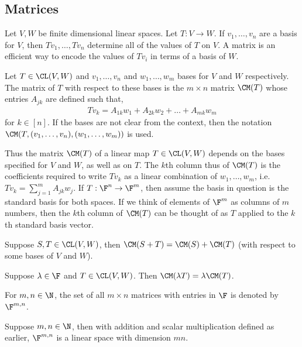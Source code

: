\documentclass{article}
\begin{document}
\subsection{Matrices}
  Let $V, W$ be finite dimensional linear spaces. Let $T: V \to W$. If $v_1, \dots, v_n$ are a basis for $V$, then $Tv_1, \dots, Tv_n$ determine all of the values of $T$ on $V$. A matrix is
  an efficient way to encode the values of $Tv_i$ in terms of a basis of $W$.
  \begin{defn}
    Let $T \in \CL(V, W)$ and $v_1, \dots, v_n$ and $w_1, \dots, w_m$ bases for $V$ and $W$ respectively. The matrix of $T$ with respect to these bases is the $m\times n$ matrix $\CM(T)$
    whose entries $A_{jk}$ are defined such that,
    \begin{align*}
      Tv_k = A_{1k}w_1 + A_{2k}w_2 + \dots + A_{mk}w_m
    \end{align*}
    for $k \in [n]$. If the bases are not clear from the context, then the notation $\CM(T, (v_1, \dots, v_n), (w_1, \dots, w_m))$ is used.
  \end{defn}
  Thus the matrix $\CM(T)$ of a linear map $T \in \CL(V, W)$ depends on the bases specified for $V$ and $W$, as well as on $T$. The $k$th column thus of $\CM(T)$ is the coefficients required
  to write $Tv_k$ as a linear combination of $w_1, \dots, w_m$, i.e. $Tv_k = \sum_{j = 1}^{m}A_{jk}w_j$. If $T: \F^n \to \F^m$, then assume the basis in question is the standard basis for
  both spaces. If we think of elements of $\F^m$ as columns of $m$ numbers, then the $k$th column of $\CM(T)$ can be thought of as $T$ applied to the $k$th standard basis vector.
  \begin{prop}
    Suppose $S, T \in \CL(V, W)$, then $\CM(S + T) = \CM(S) + \CM(T)$ (with respect to some bases of $V$ and $W$).
  \end{prop}
  \begin{prop}
    Suppose $\lambda \in \F$ and $T \in \CL(V, W)$. Then $\CM(\lambda T) = \lambda\CM(T)$.
  \end{prop}
  \begin{defn}
    For $m, n \in \N$, the set of all $m\times n$ matrices with entries in $\F$ is denoted by $\F^{m, n}$.
  \end{defn}
  \begin{prop}
    Suppose $m, n \in \N$, then with addition and scalar multiplication defined as earlier, $\F^{m, n}$ is a linear space with dimension $mn$.
  \end{prop}
\end{document}
